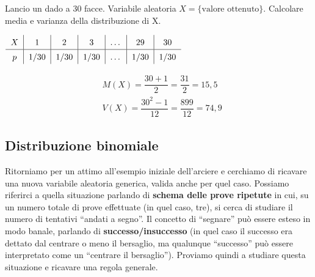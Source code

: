 \begin{esempio}
\begin{esercizio} Lancio un dado a 30 facce. Variabile aleatoria $X=\{\text{valore ottenuto}\}$. Calcolare media e varianza della distribuzione di X.\\[6pt]
\begin{minipage}[c]{.6\textwidth}
\begin{center}
 \(\renewcommand\arraystretch{1.4}
\setlength\arraycolsep{22pt}
\begin{tabular}{c|c|c|c|c|c|c}
$X$ & 1 & 2 & 3 &  \dots &29&30\\
\hline
$p$ &1/30 & 1/30 & 1/30 &\dots & 1/30& 1/30 \\
\end{tabular}\)
\end{center}

\end{minipage}
\begin{minipage}[c]{.4\textwidth}
\[\begin{split} &M(X) = \dfrac{30+1}{2} = \dfrac{31}{2}=15,5 \\
 &V(X)= \dfrac{30^2-1}{12} = \dfrac{899}{12}=74,9
\end{split}\]
\end{minipage}
\end{esercizio}


\end{esempio}
\subsection{Distribuzione binomiale}

Ritorniamo per un attimo all'esempio iniziale dell'arciere e cerchiamo di ricavare una nuova variabile aleatoria generica, valida anche per quel caso. Possiamo riferirci a quella situazione parlando di \textbf{schema delle prove ripetute} in cui, su un numero totale di prove effettuate (in quel caso, tre), si cerca di studiare il numero di tentativi ``andati a segno''. Il concetto di ``segnare'' può essere esteso in modo banale, parlando di \textbf{successo/insuccesso} (in quel caso il successo era dettato dal centrare o meno il bersaglio, ma qualunque ``successo'' può essere interpretato come un ``centrare il bersaglio''). Proviamo quindi a studiare questa situazione e ricavare una regola generale.

